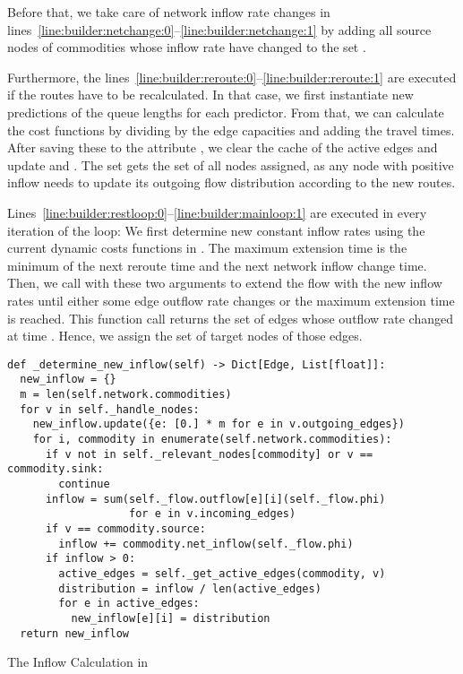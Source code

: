 Before that, we take care of network inflow rate changes in lines~\ref{line:builder:netchange:0}--\ref{line:builder:netchange:1} by adding all source nodes of commodities whose inflow rate have changed to the set .

Furthermore, the lines~\ref{line:builder:reroute:0}--\ref{line:builder:reroute:1} are executed if the routes have to be recalculated.
In that case, we first instantiate new predictions of the queue lengths for each predictor.
From that, we can calculate the cost functions by dividing by the edge capacities and adding the travel times.
After saving these to the attribute , we clear the cache of the active edges and update  and .
The set  gets the set of all nodes assigned, as any node with positive inflow needs to update its outgoing flow distribution according to the new routes.

Lines~\ref{line:builder:restloop:0}--\ref{line:builder:mainloop:1} are executed in every iteration of the loop:
We first determine new constant inflow rates using the current dynamic costs functions in .
The maximum extension time is the minimum of the next reroute time and the next network inflow change time.
Then, we call  with these two arguments to extend the flow with the new inflow rates until either some edge outflow rate changes or the maximum extension time is reached.
This function call returns the set of edges whose outflow rate changed at time .
Hence, we assign  the set of target nodes of those edges. 

\begin{algorithm}
  \begin{verbatim}
def _determine_new_inflow(self) -> Dict[Edge, List[float]]:
  new_inflow = {}
  m = len(self.network.commodities)
  for v in self._handle_nodes:
    new_inflow.update({e: [0.] * m for e in v.outgoing_edges})
    for i, commodity in enumerate(self.network.commodities):
      if v not in self._relevant_nodes[commodity] or v == commodity.sink:
        continue
      inflow = sum(self._flow.outflow[e][i](self._flow.phi)
                   for e in v.incoming_edges)
      if v == commodity.source:
        inflow += commodity.net_inflow(self._flow.phi)
      if inflow > 0:
        active_edges = self._get_active_edges(commodity, v)
        distribution = inflow / len(active_edges)
        for e in active_edges:
          new_inflow[e][i] = distribution
  return new_inflow
\end{verbatim}
\caption{The Inflow Calculation in }
\label{alg:determine-new-inflow}
\end{algorithm}


